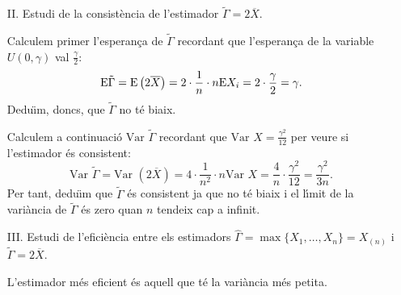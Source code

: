 {\begin{itemize}
	Calculem ara la vari\`ancia de $\hat{\Gamma}$:
	\[
	\mbox{Var } \hat{\Gamma} = \EE\left( {\hat{\Gamma}}^2\right) 
	-{(\EE\hat\Gamma)}^2.
	\]
	Calculem $\EE\left( {\hat{\Gamma}}^2\right) $:
	\[
	 \EE\left( {\hat{\Gamma}}^2\right) =\int_0^\gamma x^2 
	 f_{\hat{\Gamma}}(x)\, dx = \int_0^\gamma \frac{n x^{n+1}}{\gamma^n}\, 
	 dx =\frac{n}{\gamma^n} 
    {\left[\frac{x^{n+2}}{n+2}\right]}_0^\gamma =\frac{n\gamma^2}{n+2}.
	\]
	La vari\`ancia de $\hat{\Gamma}$ valdr\`a:
	\begin{eqnarray*}
	\mbox{Var }\hat{\Gamma} & = & \EE\left( {\hat{\Gamma}}^2\right) 
	-{(\EE\hat\Gamma)}^2 = \frac{n}{n+2} \gamma^2 - \frac{n^2}{{(n+1)}^2} 
	\gamma^2 \\ & = & \gamma^2 \left(\frac{n}{n+2} -\frac{n^2}{{(n+1)}^2} 
	\right)=\frac{n}{(n+2) {(n+1)}^2} \gamma^2.
	\end{eqnarray*}
	Observem que $\lim\limits_{n\to\infty} \mbox{Var } \hat{\Gamma} =0$. Per 
	tant $\hat{\Gamma}$ \'es un estimador consistent.

	
	\item[II.] Estudi de la consist\`encia de l'estimador $\tilde{\Gamma} = 
	2\overline{X}$.
	
	Calculem primer l'esperan\c{c}a de $\tilde{\Gamma}$ recordant que 
	l'esperan\c{c}a de la variable\break $U(0,\gamma)$ val 
	$\frac{\gamma}{2}$:
	\[
	{\rm E}\tilde{\Gamma} = {\rm E}\left(2\overline{X}\right)= 2\cdot\frac{1}{n}\cdot n {\rm E} X_i = 
	2\cdot\frac{\gamma}{2} =\gamma.
	\]
	Dedu\"{\i}m, doncs, que $\tilde{\Gamma}$ no t\'e biaix.
	
	Calculem a continuaci\'o $\mbox{Var }\tilde{\Gamma}$ recordant que 
	$\mbox{Var } X=\frac{\gamma^2}{12}$ per veure si 
	l'estimador \'es consistent:
	\[
	\mbox{Var }\tilde{\Gamma}=\mbox{Var }\left( 2\overline{X}\right)= 
	4\cdot\frac{1}{n^2}\cdot n \mbox{Var } X 
	=\frac{4}{n}\cdot\frac{\gamma^2}{12}=\frac{\gamma^2}{3 n}.
	\]
	Per tant, dedu\"{\i}m que $\tilde{\Gamma}$ \'es consistent ja que no t\'e biaix i 
	el l\'{\i}mit de la vari\`ancia de $\tilde{\Gamma}$ \'es zero quan $n$ tendeix cap 
	a infinit.
	
	\item[III.] Estudi de l'efici\`encia entre els estimadors $\hat{\Gamma}=
    \max\{X_1,\ldots,X_n\}=X_{(n)}$ i $\tilde{\Gamma}=2 \overline{X}$.

    
    L'estimador m\'es eficient \'es aquell que t\'e la vari\`ancia m\'es petita. 


\end{itemize}}
